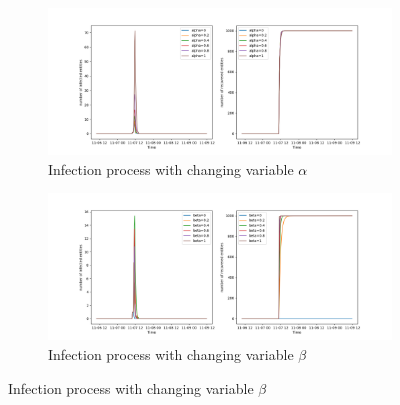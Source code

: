 \begin{figure}[!ht]
    \begin{subfigure}{\textwidth}
    \centering
    \includegraphics[scale=.5]{figs/eval/scenario1/alpha_mix.png}
    \caption{Infection process with changing variable $\alpha$}
    \label{scen1variablealpha} 
    \end{subfigure}
    \begin{subfigure}{\textwidth}
    \centering
    \includegraphics[scale=.5]{figs/eval/scenario1/beta_mix.png}
    \caption{Infection process with changing variable $\beta$}
    \label{scen1variablebeta} 
    \end{subfigure}
\end{figure}


